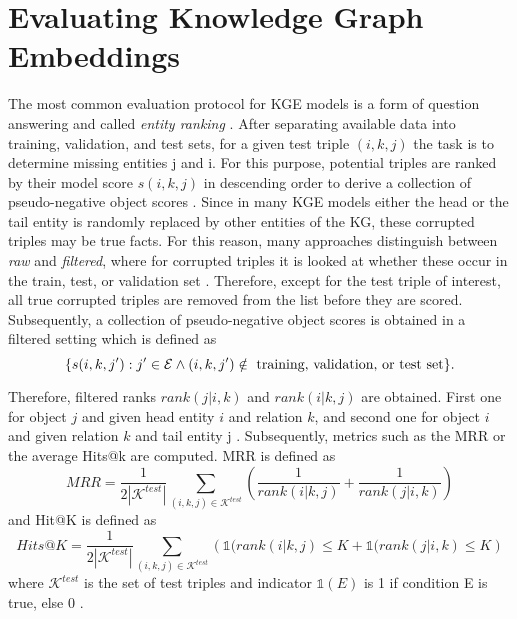 \section{Evaluating Knowledge Graph Embeddings} 
\label{sec:evaluating_knowledge_graph_embeddings}
%
The most common evaluation protocol for \ac{KGE} models is a form of question answering and called \textit{entity ranking} \cite{Ruffinelli2020You}.
After separating available data into training, validation, and test sets, for a given test triple $(i,k,j)$ the task is to determine missing entities j and i.
For this purpose, potential triples are ranked by their model score $s(i, k, j)$ in descending order to derive a collection of pseudo-negative object scores \cite{Ruffinelli2020You}.
Since in many \ac{KGE} models either the head or the tail entity is randomly replaced by other entities of the \ac{KG}, these corrupted triples may be true facts.
For this reason, many approaches distinguish between \textit{raw} and \textit{filtered}, where for corrupted triples it is looked at whether these occur in the train, test, or validation set \cite{TransE}.
Therefore, except for the test triple of interest, all true corrupted triples are removed from the list before they are scored.
Subsequently, a collection of pseudo-negative object scores is obtained in a filtered setting  which is defined as \cite{Ruffinelli2020You}
$$\{ s(i, k, j') : j' \in \mathcal{E} \wedge (i, k, j') \notin \text{ training, validation, or test set}\}.$$

Therefore, filtered ranks $rank(j|i, k)$ and $rank(i|k, j)$ are obtained.
First one for object $j$ and given head entity $i$ and relation $k$, 
and second one for object $i$ and given relation $k$ and tail entity j \cite{Ruffinelli2020You}.
Subsequently, metrics such as the \ac{MRR} or the average Hits@k are computed.
MRR is defined as \cite{Ruffinelli2020You}
\begin{equation}
    MRR = \frac{1}{2 |\mathcal{K}^{test}|} \sum_{(i,k,j) \in  \mathcal{K}^{test}} \left( \frac{1}{rank(i |k,j)} + \frac{1}{rank(j|i,k)} \right)
\end{equation}
and Hit@K is defined as \cite{Ruffinelli2020You}
\begin{equation}
    Hits@K = \frac{1}{2|\mathcal{K}^{test}|} \sum_{(i,k,j) \in  \mathcal{K}^{test}} \left( \mathds{1} (rank(i |k,j) \leq K + \mathds{1}  (rank(j|i,k) \leq K \right)
\end{equation}
where $\mathcal{K}^{test}$ is the set of test triples and indicator $\mathds{1}(E)$ is 1 if condition E is true, else 0 \cite{Ruffinelli2020You}.